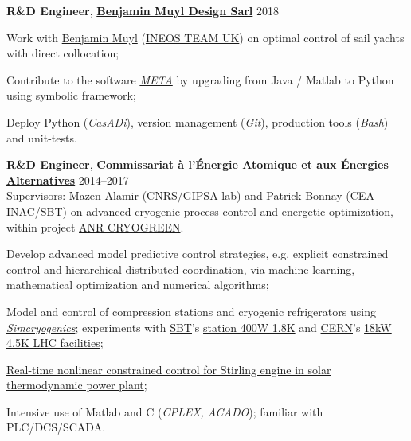 \documentclass[a4paper,11pt]{article}
\begin{document}
	\vspace{0.1cm}
	
	\textbf{R\&D Engineer}, \href{https://www.bmuyl.com/}{\textbf{Benjamin Muyl Design Sarl}}
	\hfill {2018} 
	\begin{innerlist}
		\item Work with \href{https://www.linkedin.com/in/bmuyl/}{Benjamin Muyl}  (\href{https://www.ineosteamuk.com/}{INEOS TEAM UK}) on optimal control of sail yachts with direct collocation;
		\item Contribute to the software \href{https://pole-mer-bretagne-atlantique.com/en/component/projects/project/2235}{\emph{META}} by upgrading from Java / Matlab to Python using symbolic framework; 
		\item Deploy Python (\emph{CasADi}), version management (\emph{Git}), production tools (\emph{Bash}) and unit-tests.
	\end{innerlist}
	
	\vspace{0.1cm}
	
	\textbf{R\&D Engineer}, \href{http://www.cea.fr/}{\textbf{Commissariat \`{a} l'\'{E}nergie Atomique et aux \'{E}nergies Alternatives}} 
	\hfill {2014--2017} \\
	Supervisors: \href{http://www.mazenalamir.fr/home/}{Mazen Alamir} (\href{http://www.cnrs.fr/}{CNRS/GIPSA-lab}) and \href{https://www.researchgate.net/profile/P_Bonnay}{Patrick Bonnay} (\href{http://www.d-sbt.fr/en}{CEA-INAC/SBT}) on \href{https://vuongvtrinh.github.io/project/cryogenic-refrigerator/}{advanced cryogenic process control and energetic optimization}, within project \href{https://anr.fr/Project-ANR-13-SEED-0005}{ANR CRYOGREEN}.
	\begin{innerlist}
		\item Develop advanced model predictive control strategies, e.g. explicit constrained control and hierarchical distributed coordination, via machine learning, mathematical optimization and numerical algorithms;
		\item Model and control of compression stations and cryogenic refrigerators using \href{http://www.d-sbt.fr/en/Pages/News/2016_Francois-Bonne.aspx}{\emph{Simcryogenics}}; experiments with \href{http://www.d-sbt.fr/en}{SBT}'s \href{http://inac.cea.fr/en/Phocea/Vie_des_labos/Ast/ast_visu.php?id_ast=771}{station 400W 1.8K} and \href{https://cern.ch}{CERN}'s \href{https://cds.cern.ch/record/708291}{18kW 4.5K LHC facilities};
		\item \href{https://vuongvtrinh.github.io/project/solar-energy/}{Real-time nonlinear constrained control for Stirling engine in solar thermodynamic power plant};
		\item Intensive use of Matlab and C (\emph{CPLEX, ACADO}); familiar with PLC/DCS/SCADA.
	\end{innerlist}
	
\end{document}
